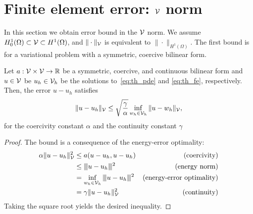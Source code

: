 \section{Finite element error: $\mathcal{V}$ norm}
In this section we obtain error bound in the $\mathcal{V}$ norm.  We assume $H^1_0(\Omega) \subset \mathcal{V} \subset H^1(\Omega)$, and $\| \cdot \|_{\mathcal{V}}$ is equivalent to $\| \cdot \|_{H^1(\Omega)}$.  The first bound is for a variational problem with a symmetric, coercive bilinear form.
\begin{lemma}
  \label{lemma:th_cea_sym}
  Let $a: \mathcal{V} \times \mathcal{V} \to \mathbb{R}$ be a symmetric, coercive, and continuous bilinear form and $u \in \mathcal{V}$ be $u_h \in \mathcal{V}_h$ be the solutions to~\eqref{eq:th_pde} and \eqref{eq:th_fe}, respectively. Then, the error $u - u_h$ satisfies
  \begin{equation}
    \| u - u_h \|_{\mathcal{V}} \leq \sqrt{\frac{\gamma}{\alpha}} \inf_{w_h \in \mathcal{V}_h} \| u - w_h \|_{\mathcal{V}},
    \label{eq:th_cea_sym}
  \end{equation}
  for the coercivity constant $\alpha$ and the continuity constant $\gamma$
  \begin{proof}
    The bound is a consequence of the energy-error optimality:
    \begin{align*}
      \alpha \| u - u_h \|^2_{\mathcal{V}}
      &\leq a(u - u_h, u - u_h) & \text{(coercivity)} \\
      &\leq |\kern-1pt|\kern-1pt|  u - u_h  |\kern-1pt|\kern-1pt|^2 & \text{(energy norm)} \\
      & = \inf_{w_h \in \mathcal{V}_h} |\kern-1pt|\kern-1pt|  u - u_h  |\kern-1pt|\kern-1pt|^2 & \text{(energy-error optimality)} \\
      & = \gamma \| u - u_h \|^2_{\mathcal{V}} & \text{(continuity)}
    \end{align*}
    Taking the square root yields the desired inequality.
  \end{proof}
\end{lemma}

